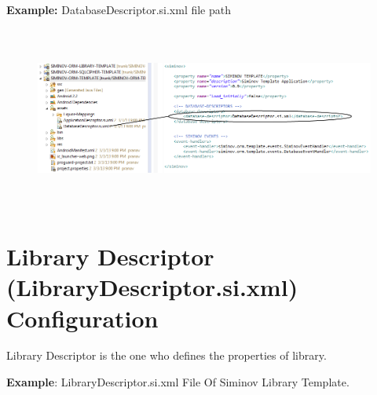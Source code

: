 \newpage
	\par
		\textbf{Example:} DatabaseDescriptor.si.xml file path
		\begin{figure}[htbp]
			\centering
				\includegraphics[height=6cm]{Resources/siminov_template_application_database_descriptor_path_example.png}
		\end{figure}




\newpage
\section{Library Descriptor (LibraryDescriptor.si.xml) Configuration}
	Library Descriptor is the one who defines the properties of library.



\textbf{Example}: LibraryDescriptor.si.xml File Of Siminov Library Template.


